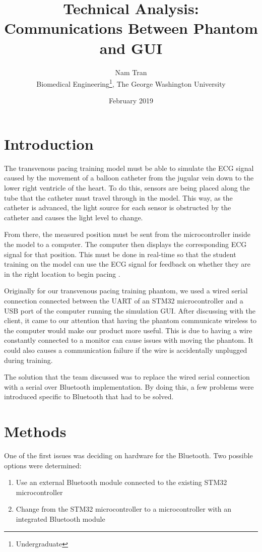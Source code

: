 \documentclass[12pt, titlepage]{article}
\title{Technical Analysis: Communications Between Phantom and GUI}
\author{Nam Tran\\ Biomedical Engineering\thanks{Undergraduate}, The George Washington University}
\date{February 2019}
\begin{document}
\maketitle

\section{Introduction}
The transvenous pacing training model must be able to simulate the ECG signal caused by the movement of a balloon catheter from the jugular vein down to the lower right ventricle of the heart. To do this, sensors are being placed along the tube that the catheter must travel through in the model. This way, as the catheter is advanced, the light source for each sensor is obstructed by the catheter and causes the light level to change.

From there, the measured position must be sent from the microcontroller inside the model to a computer. The computer then displays the corresponding ECG signal for that position. This must be done in real-time so that the student training on the model can use the ECG signal for feedback on whether they are in the right location to begin pacing \cite{backgroundreport}.

Originally for our transvenous pacing training phantom, we used a wired serial connection connected between the UART of an STM32 microcontroller and a USB port of the computer running the simulation GUI. After discussing with the client, it came to our attention that having the phantom communicate wireless to the computer would make our product more useful. This is due to having a wire constantly connected to a monitor can cause issues with moving the phantom. It could also causes a communication failure if the wire is accidentally unplugged during training.

The solution that the team discussed was to replace the wired serial connection with a serial over Bluetooth implementation. By doing this, a few problems were introduced specific to Bluetooth that had to be solved.

\section{Methods}
One of the first issues was deciding on hardware for the Bluetooth. Two possible options were determined:

\begin{enumerate}
  \item Use an external Bluetooth module connected to the existing STM32 microcontroller
  \item Change from the STM32 microcontroller to a microcontroller with an integrated Bluetooth module
\end{enumerate}
\end{document}
